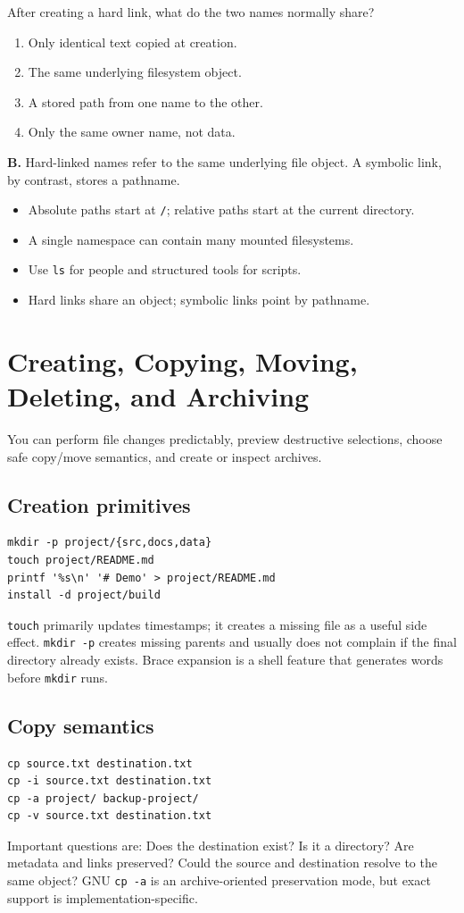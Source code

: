 \documentclass[11pt,oneside,openany]{book}
\newcommand{\fourchoices}[4]{%
  \begin{enumerate}[label=\Alph*),leftmargin=2em,itemsep=0.25em]
    \item #1
    \item #2
    \item #3
    \item #4
  \end{enumerate}}
\newcommand{\chaptergoals}[1]{%
  \begin{tcolorbox}[colback=Paper,colframe=Blue,title={Learning outcomes},fonttitle=\bfseries]
  #1
  \end{tcolorbox}}
\begin{document}
\begin{questionbox}[title={Hard 5.2 -- Links}]
After creating a hard link, what do the two names normally share?
\fourchoices{Only identical text copied at creation.}{The same underlying filesystem object.}{A stored path from one name to the other.}{Only the same owner name, not data.}
\end{questionbox}
\begin{answerbox}
\textbf{B.} Hard-linked names refer to the same underlying file object. A symbolic link, by contrast, stores a pathname.
\end{answerbox}

\begin{recapbox}
\begin{itemize}
  \item Absolute paths start at \texttt{/}; relative paths start at the current directory.
  \item A single namespace can contain many mounted filesystems.
  \item Use \texttt{ls} for people and structured tools for scripts.
  \item Hard links share an object; symbolic links point by pathname.
\end{itemize}
\end{recapbox}

\chapter{Creating, Copying, Moving, Deleting, and Archiving}
\chaptergoals{You can perform file changes predictably, preview destructive selections, choose safe copy/move semantics, and create or inspect archives.}

\section{Creation primitives}
\begin{lstlisting}
mkdir -p project/{src,docs,data}
touch project/README.md
printf '%s\n' '# Demo' > project/README.md
install -d project/build
\end{lstlisting}
\texttt{touch} primarily updates timestamps; it creates a missing file as a useful side effect. \texttt{mkdir -p} creates missing parents and usually does not complain if the final directory already exists. Brace expansion is a shell feature that generates words before \texttt{mkdir} runs.

\section{Copy semantics}
\begin{lstlisting}
cp source.txt destination.txt
cp -i source.txt destination.txt
cp -a project/ backup-project/
cp -v source.txt destination.txt
\end{lstlisting}
Important questions are: Does the destination exist? Is it a directory? Are metadata and links preserved? Could the source and destination resolve to the same object? GNU \texttt{cp -a} is an archive-oriented preservation mode, but exact support is implementation-specific.
\end{document}
